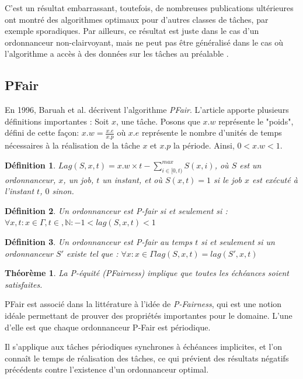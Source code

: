 \documentclass[11pt,a4paper,oneside]{report}
\newtheorem{mydef}{Définition}
\newtheorem{mytheorem}{Théorème}
\begin{document}
	C'est un résultat embarrassant, toutefois, de nombreuses publications ultérieures ont montré des algorithmes 
	optimaux pour d'autres classes de tâches, par exemple sporadiques. 
	Par ailleurs, ce résultat est juste dans le cas d'un ordonnanceur non-clairvoyant, 
	mais ne peut pas être généralisé dans le cas où 
	l'algorithme a accès à des données sur les tâches au préalable \cite{fisher_optimal_2010}.
	
	\subsection{PFair}
	En 1996, Baruah et al. décrivent l'algorithme \textit{PFair}. \cite{baruah_proportionate_1996}
	L'article apporte plusieurs définitions importantes :\medskip
	Soit $x$, une tâche. 
	Posons que $x.w$ représente le "poids", défini de cette façon: $x.w = \frac{x.e}{x.p}$ où
	$x.e$ représente le nombre d'unités de temps nécessaires à la réalisation de la tâche 
	$x$	et $x.p$ la période. Ainsi, $0 < x.w < 1$.
	
	\begin{mydef}
		$Lag(S, x, t) = x.w \times t - \sum_{i\in[0,t)}^{max} S(x, i)$, où 
		$S$ est un ordonnanceur, $x$, un job, $t$ un instant, et où $S(x, t) = 1$ si 
		le job $x$ est exécuté à l'instant $t$, $0$ sinon.
	\end{mydef}
	\begin{mydef}
		Un ordonnanceur est P-fair si et seulement si :\medskip
		$\forall x, t : x \in \Gamma, t\in , \mathbb{N} : -1 < lag(S,x,t) < 1$
	\end{mydef}
	\begin{mydef}
		Un ordonnanceur est P-fair au temps $t$ si et seulement si un ordonnanceur $S'$ existe tel que : \medskip
		$\forall x: x \in \Gamma  lag(S,x,t) = lag(S',x,t)$
	\end{mydef}
	\begin{mytheorem}
		La P-équité (PFairness) implique que toutes les échéances soient satisfaites.
	\end{mytheorem}
	
	PFair est associé dans la littérature à l'idée de \textit{P-Fairness}, qui est une notion 
	idéale permettant de prouver des propriétés importantes pour le domaine. 
	L'une d'elle est que chaque ordonnanceur P-Fair est périodique. \medskip
	
	Il s'applique aux tâches périodiques synchrones à échéances implicites, 
	et l'on connaît le temps de réalisation des tâches, 
	ce qui prévient des résultats négatifs précédents contre 
	l'existence d'un ordonnanceur optimal.\medskip
	
\end{document}
